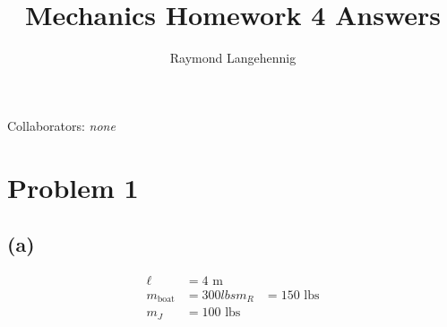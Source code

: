 \documentclass{article}
\title{Mechanics Homework 4 Answers}
\author{Raymond Langehennig}
\begin{document}
\maketitle
Collaborators: \textit{none}

\section*{Problem 1}
\subsection*{(a)}
\begin{align*}
    \ell&= 4 \mbox{ m}   \\
    m_\mathrm{boat} &= 300 lbs
    m_R &= 150 \mbox{ lbs} \\
    m_J &= 100 \mbox{ lbs} \\    
    
\end{align*}
\end{document}
